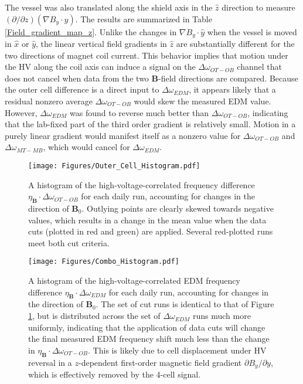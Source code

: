 \documentclass [10pt, twoside] {uwthesis}[2012/04/02]
\begin{document}
The vessel was also translated along the shield axis in the $\hat{z}$ direction to measure $(\partial/\partial z)(\nabla B_y\cdot\hat{y})$. The results are summarized in Table \ref{Field_gradient_map_z}. Unlike the changes in $\nabla B_y\cdot\hat{y}$ when the vessel is moved in $\hat{x}$ or $\hat{y}$, the linear vertical field gradients in $\hat{z}$ are substantially different for the two directions of magnet coil current. This behavior implies that motion under the HV along the coil axis can induce a signal on the $\Delta\omega_{OT-OB}$ channel that does not cancel when data from the two $\mathbf{B}$-field directions are compared. Because the outer cell difference is a direct input to $\Delta\omega_{EDM}$, it appears likely that a residual nonzero average $\Delta\omega_{OT-OB}$ would skew the measured EDM value. However, $\Delta\omega_{EDM}$ was found to reverse much better than $\Delta\omega_{OT-OB}$, indicating that the lab-fixed part of the third order gradient is relatively small. Motion in a purely linear gradient would manifest itself as a nonzero value for $\Delta\omega_{OT-OB}$ and $\Delta\omega_{MT-MB}$, which would cancel for $\Delta\omega_{EDM}$. 

\begin{figure} \begin{center}
\texttt{[image: Figures/Outer\_Cell\_Histogram.pdf]}
\end{center}
\caption[Histogram of HV-correlated outer cell frequency difference]%
{\narrower A histogram of the high-voltage-correlated frequency difference $\eta_{\mathbf{B}}\cdot\Delta\omega_{OT-OB}$ for each daily run, accounting for changes in the direction of $\mathbf{B}_0$. Outlying points are clearly skewed towards negative values, which results in a change in the mean value when the data cuts (plotted in red and green) are applied. Several red-plotted runs meet both cut criteria.}
\label{Outer_Cell_Histogram}
\end{figure}
\begin{figure}
\begin{center}
\texttt{[image: Figures/Combo\_Histogram.pdf]}
\end{center}
\caption[Histogram of HV-correlated $\Delta\omega_{EDM}$]%
{\narrower A histogram of the high-voltage-correlated EDM frequency difference $\eta_{\mathbf{B}}\cdot\Delta\omega_{EDM}$ for each daily run, accounting for changes in the direction of $\mathbf{B}_0$. The set of cut runs is identical to that of Figure \ref{Outer_Cell_Histogram}, but is distributed across the set of $\Delta\omega_{EDM}$ runs much more uniformly, indicating that the application of data cuts will change the final measured EDM frequency shift much less than the change in $\eta_{\mathbf{B}}\cdot\Delta\omega_{OT-OB}$. This is likely due to cell displacement under HV reversal in a $z$-dependent first-order magnetic field gradient $\partial B_y/\partial y$, which is effectively removed by the 4-cell signal.}
\label{Combo_Histogram}
\end{figure}
\end{document}
